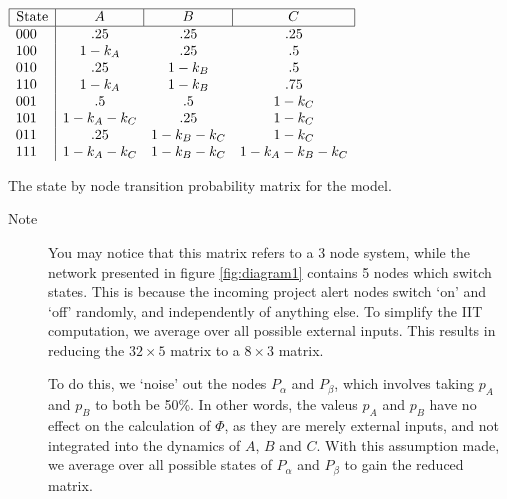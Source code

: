 \begin{table}[h]
	\centering
	

	$\begin{array}{l|ccc}
	\hline
	\multicolumn{1}{|l|}{\text{State}} & \multicolumn{1}{c|}{A} & \multicolumn{1}{c|}{B} & \multicolumn{1}{c|}{C} \\ \hline
	000                         & .25                    & .25                    & .25                    \\
	100                         & 1-k_A                  & .25                    & .5                     \\
	010                         & .25                    & 1-k_B                  & .5                     \\
	110                         & 1-k_A                  & 1-k_B                  & .75                    \\
	001                         & .5                     & .5                     & 1-k_C                  \\
	101                         & 1-k_A-k_C              & .25                    & 1-k_C                  \\
	011                         & .25                    & 1-k_B-k_C              & 1-k_C                  \\
	111                         & 1-k_A-k_C              & 1-k_B-k_C              & 1-k_A-k_B-k_C         
	\end{array}$
	\caption{The state by node transition probability matrix for the model.}
	\label{mat:model1}
\end{table}

\begin{description}
	\item[Note] You may notice that this matrix refers to a 3 node system, while the network presented in figure \ref{fig:diagram1} contains 5 nodes which switch states. This is because the incoming project alert nodes switch `on' and `off' randomly, and independently of anything else. To simplify the IIT computation, we average over all possible external inputs. This results in reducing the $32\times5$ matrix to a $8\times3$ matrix.
	
	To do this, we `noise' out the nodes $P_{\alpha}$ and $P_{\beta}$, which involves taking $p_A$ and $p_B$ to both be 50\%. In other words, the valeus $p_A$ and $p_B$ have no effect on the calculation of $\Phi$, as they are merely external inputs, and not integrated into the dynamics of $A$, $B$ and $C$. With this assumption made, we average over all possible states of $P_\alpha$ and $P_\beta$ to gain the reduced matrix.
\end{description}

